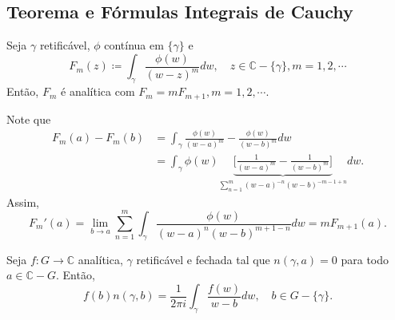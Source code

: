 \documentclass[ComplexAnalysis/complex.tex]{subfiles}
\begin{document}
\subsection{Teorema e Fórmulas Integrais de Cauchy}
\begin{lmm*}
	Seja $\gamma$ retificável, $\phi$ contínua em $\{\gamma\} $ e
	$$
		F_{m}(z)\coloneqq  \int_{\gamma}^{}\frac{\phi(w)}{(w-z)^{m}}dw, \quad z\in \mathbb{C}-\{\gamma\}, m=1, 2, \cdots
	$$
	Então, $F_{m}$ é analítica com $F_{m} = mF_{m+1}, m = 1, 2, \cdots$.
\end{lmm*}
\begin{proof*}
	Note que
	\begin{align*}
		F_{m}(a) - F_{m}(b) & = \int_{\gamma}^{}\frac{\phi(w)}{(w-a)^{m}} - \frac{\phi(w)}{(w-b)^{m}}dw                                                                        \\
		                    & = \int_{\gamma}^{}\phi(w)\underbrace{\biggl[\frac{1}{(w-a)^{m}} - \frac{1}{(w-b)^{m}}\biggr]}_{\sum\limits_{n=1}^{m}(w-a)^{-n}(w-b)^{-m-1+n}}dw.
	\end{align*}
	Assim,
	$$
		F_{m}'(a) = \lim_{b\to{a}}\sum\limits_{n=1}^{m}\int_{\gamma}^{}\frac{\phi(w)}{(w-a)^{n}(w-b)^{m+1-n}}dw = mF_{m+1}(a).
	$$
\end{proof*}
\begin{theorem*}
	Seja $f:G\rightarrow \mathbb{C}$ analítica, $\gamma$ retificável e fechada tal que $n(\gamma, a) = 0$ para todo $a\in \mathbb{C}-G.$
	Então,
	$$
		f(b)n(\gamma, b) = \frac{1}{2\pi i}\int_{\gamma}^{}\frac{f(w)}{w-b}dw, \quad b\in{G-\{\gamma\}}.
	$$
\end{theorem*}
\end{document}
